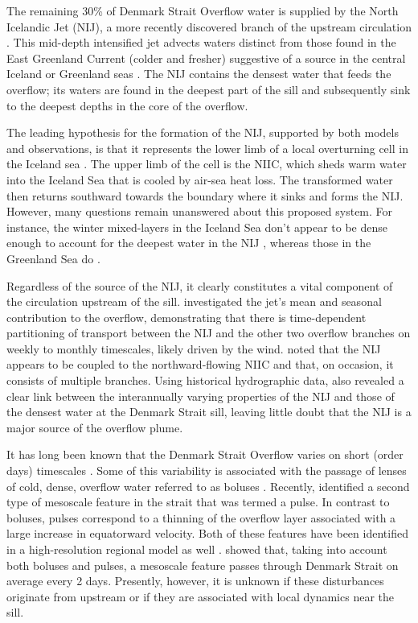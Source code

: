 \documentclass[12pt,titlepage,figuresatend]{article}
\begin{document}
The remaining 30\% of Denmark Strait Overflow water is supplied by the North Icelandic Jet (NIJ), a more recently discovered branch of the upstream circulation \cite[]{Steingrimur2004,Vage2011}. This mid-depth intensified jet advects waters distinct from those found in the East Greenland Current (colder and fresher) suggestive of a source in the central Iceland or Greenland seas \cite[]{Vage2011,Vage2015,Harden2016}. The NIJ contains the densest water that feeds the overflow; its waters are found in the deepest part of the sill \cite[]{Mastropole2017} and subsequently sink to the deepest depths in the core of the overflow.

The leading hypothesis for the formation of the NIJ, supported by both models and observations, is that it represents the lower limb of a local overturning cell in the Iceland sea \cite[]{Vage2011,Behrens2017}. The upper limb of the cell is the NIIC, which sheds warm water into the Iceland Sea that is cooled by air-sea heat loss. The transformed water then returns southward towards the boundary where it sinks and forms the NIJ. However, many questions remain unanswered about this proposed system. For instance, the winter mixed-layers in the Iceland Sea don't appear to be dense enough to account for the deepest water in the NIJ \cite[]{Vage2015}, whereas those in the Greenland Sea do \cite[]{Strass1993,Rudels2002}.

Regardless of the source of the NIJ, it clearly constitutes a vital component of the circulation upstream of the sill. \cite{Harden2016} investigated the jet's mean and seasonal contribution to the overflow, demonstrating that there is time-dependent partitioning of transport between the NIJ and the other two overflow branches on weekly to monthly timescales, likely driven by the wind. \cite{Pickart2017} noted that the NIJ appears to be coupled to the northward-flowing NIIC and that, on occasion, it consists of multiple branches. Using historical hydrographic data, \cite{Pickart2017} also revealed a clear link between the interannually varying properties of the NIJ and those of the densest water at the Denmark Strait sill, leaving little doubt that the NIJ is a major source of the overflow plume. 

It has long been known that the Denmark Strait Overflow varies on short (order days) timescales \cite[]{Smith1976,Bruce1995,Kase2003}. Some of this variability is associated with the passage of lenses of cold, dense, overflow water referred to as boluses \cite[]{Cooper1955}. Recently, \cite{Appen2017} identified a second type of mesoscale feature in the strait that was termed a pulse. In contrast to boluses, pulses correspond to a thinning of the overflow layer associated with a large increase in equatorward velocity. Both of these features have been identified in a high-resolution regional model as well \cite[]{Almansi2017}. \cite{Appen2017} showed that, taking into account both boluses and pulses, a mesoscale feature passes through Denmark Strait on average every 2 days. Presently, however, it is unknown if these disturbances originate from upstream or if they are associated with local dynamics near the sill. 
\end{document}
